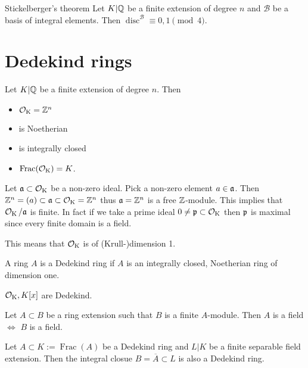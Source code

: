 \documentclass[12pt, a4paper]{article}
\newcommand{\BB}{\mathscr{B}}
\DeclareMathOperator{\Frac}{Frac}
\DeclareMathOperator{\disc}{disc}
\begin{document}
	\begin{thm}{Stickelberger's theorem}{}
		Let $K \vert \Q$ be a finite extension of degree $n$ and $\BB$ be a 
		basis of integral elements. Then $\disc^\BB \equiv 0, 1 \pmod 4$.
	\end{thm}

	\section{Dedekind rings}

	\begin{ex}{}{}
		Let $K \vert \Q$ be a finite extension of degree $n$.
		Then 

		\begin{itemize}
			\item $\OK = \Z^n$
			\item is Noetherian
			\item is integrally closed
			\item $\Frac(\OK) = K$.
		\end{itemize}

		Let $\aa \subset \OK$ be a non-zero ideal. Pick a non-zero element 
		$a \in \aa$. Then $\Z^n = (a) \subset \aa \subset \OK = \Z^n$ 
		thus $\aa = \Z^n$ is a free $\Z$-module. This implies that 
		$\OK/\aa$ is finite. In fact if we take a prime ideal $0 \neq \pp 
		\subset \OK$ then $\pp$ is maximal since every finite domain is a field.
	\end{ex}

	\begin{rem}
		This means that $\OK$ is of (Krull-)dimension 1.	
	\end{rem}

	\begin{Def}{}{}
		A ring $A$ is a Dedekind ring if $A$ is an integrally closed, Noetherian 
		ring of dimension one.
	\end{Def}

	\begin{ex}
		$\OK, K[x]$ are Dedekind.
	\end{ex}

	\begin{Lemma}{}{}
		Let $A \subset B$ be a ring extension such that $B$ is a finite 
		$A$-module. Then $A$ is a field $\iff$ $B$ is a field.
	\end{Lemma}

	\begin{prop}{}{}
		Let $A \subset K := \Frac(A)$ be a Dedekind ring and $L\vert K$ be a 
		finite separable field extension. Then the integral closue $
		B=\overline{A}\subset L$ is also a Dedekind ring. 
	\end{prop}
\end{document}
